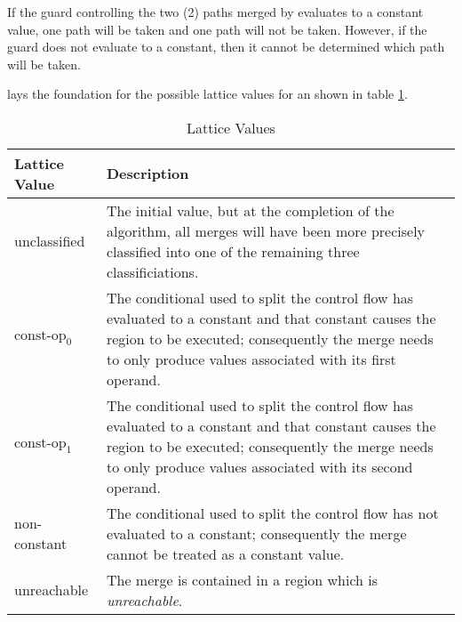 \subsubsection{}

\begin{observation}\label{obs:ccp-if-merge}
  If the guard controlling the two (2) paths merged by
   evaluates to a constant value, one path will be
  taken and one path will not be taken.  However, if the guard does
  not evaluate to a constant, then it cannot be determined which path
  will be taken.
\end{observation}

 lays the foundation for the possible lattice
values for an  shown in table
\ref{table:const-prop-if-merge-lattice}.

\begin{table}[h!]
  \begin{tabularx}{\linewidth}{|l|X|}
    \hline Lattice Value & Description \\
    \hline unclassified & The initial value, but at the completion of
    the algorithm, all merges will have been more precisely classified
    into one of the remaining three classificiations. \\

    \hline $\textrm{const-op}_0$ & The conditional used to split the
    control flow has evaluated to a constant and that constant causes
    the {true}{Gguard} region to be executed; consequently
    the merge needs to only produce values associated with its first
    operand. \\

    \hline $\textrm{const-op}_1$ & The conditional used to split the
    control flow has evaluated to a constant and that constant causes
    the {false}{Gguard} region to be executed; consequently
    the merge needs to only produce values associated with its second
    operand.\\

    \hline non-constant & The conditional used to split the control flow
    has not evaluated to a constant; consequently the merge cannot be
    treated as a constant value. \\

    \hline unreachable & The merge is contained in a region which is
    \emph{unreachable}. \\
  \hline
  \end{tabularx}
  \caption{ Lattice Values}\label{table:const-prop-if-merge-lattice}
\end{table}

